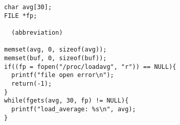 \begin{verbatim}
char avg[30];
FILE *fp;

  (abbreviation)

memset(avg, 0, sizeof(avg));
memset(buf, 0, sizeof(buf));
if((fp = fopen("/proc/loadavg", "r")) == NULL){
  printf("file open error\n");
  return(-1);
}
while(fgets(avg, 30, fp) != NULL){
  printf("load_average: %s\n", avg);  
}
\end{verbatim}
